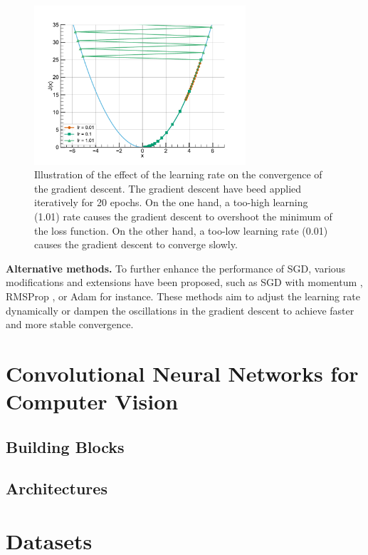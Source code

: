 \begin{figure}[htbp]
  \centering
  \includegraphics[width=0.7\textwidth]{chapter_dlo/assets/gradient_descent.pdf}
  \caption{Illustration of the effect of the learning rate on the convergence of
    the gradient descent. The gradient descent have beed applied iteratively for
    20 epochs. On the one hand, a too-high learning (1.01) rate causes the
    gradient descent to overshoot the minimum of the loss function. On the other
    hand, a too-low learning rate (0.01) causes the gradient descent to converge
    slowly.}
  \label{fig:dlo:gradient_descent}
\end{figure}

\noindent \textbf{Alternative methods.} To further enhance the performance of
\ac{SGD}, various modifications and extensions have been proposed, such as
\ac{SGD} with momentum \cite{sutskever2013importance}, RMSProp
\cite{hinton2012neural}, or Adam \cite{kingma2014adam} for instance. These
methods aim to adjust the learning rate dynamically or dampen the oscillations
in the gradient descent to achieve faster and more stable convergence.

\section{Convolutional Neural Networks for Computer Vision}\label{sec:dlo:cnn}
\subsection{Building Blocks}
\subsection{Architectures}\label{sec:dlo:architectures}

\section{Datasets}\label{sec:dlo:datasets}

